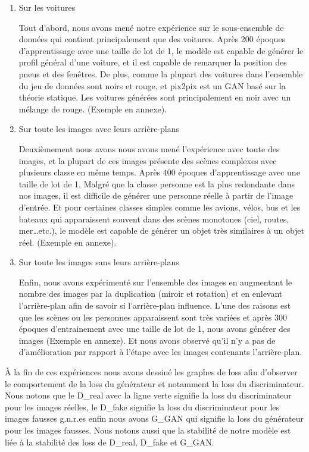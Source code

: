  \begin{enumerate}[label=(\alph*)]
 	\item Sur les voitures
 	
 	Tout d'abord, nous avons mené notre expérience sur le sous-ensemble de données qui contient principalement que des voitures. Après 200 époques d'apprentissage avec une taille de lot de 1, le modèle est capable de générer le profil général d'une voiture, et il est capable de remarquer la position des pneus et des fenêtres. De plus, comme la plupart des voitures dans l'ensemble du jeu de données sont noirs et rouge, et pix2pix est un GAN basé sur la théorie statique. Les voitures générées sont principalement en noir avec un mélange de rouge. (Exemple en annexe).
 	
 	
 	\item Sur toute les images avec leurs arrière-plans
 	
 	Deuxièmement nous avons nous avons mené l'expérience avec toute des images, et la plupart de ces images présente des scènes complexes avec plusieurs classe en même temps. Après 400 époques d'apprentissage avec une taille de lot de 1, Malgré que la classe personne est la plus redondante dans nos images, il est difficile de générer une personne réelle à partir de l'image d'entrée. Et pour certaines classes simples comme les avions, vélos, bus et les bateaux qui apparaissent souvent dans des scènes monotones (ciel, routes, mer…etc.), le modèle est capable de générer un objet très similaires à un objet réel. (Exemple en annexe).
 	
 	\item Sur toute les images sans leurs arrière-plans
 	
 	
 	Enfin, nous avons expérimenté sur l'ensemble des images en augmentant le nombre des images par la duplication (miroir et rotation) et en enlevant l'arrière-plan afin de savoir si l'arrière-plan influence. L'une des raisons est que les scènes ou les personnes apparaissent sont très variées et après 300 époques d'entrainement avec une taille de lot de 1, nous avons générer des images (Exemple en annexe). Et nous avons observé qu'il n'y a pas de d'amélioration par rapport à l'étape avec les images contenants l'arrière-plan.
 	
 \end{enumerate}

À la fin de ces expériences nous avons dessiné les graphes de loss afin d'observer le comportement de la loss du générateur et notamment la loss du discriminateur. Nous notons que le D{\_}real avec la ligne verte signifie la loss du discriminateur pour les images réelles, le D{\_}fake signifie la loss du discriminateur pour les images fausses g.n.r.es enfin nous avons G{\_}GAN qui signifie la loss du générateur pour les images fausses. Nous notons aussi que la stabilité de notre modèle est liée à la stabilité des loss de D{\_}real, D{\_}fake et G{\_}GAN.

